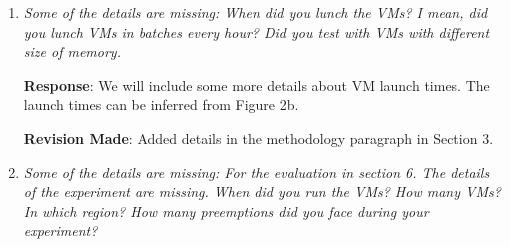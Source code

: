 \documentclass{article}
\newcommand{\resp}[1]{\textbf{Response}: #1}
\newcommand{\revmade}[1]{\textbf{Revision Made}: #1}
\begin{document}
\begin{enumerate}

\item \emph{Some of the details are missing: When did you lunch the VMs? I mean, did you lunch VMs in batches every hour? Did you test with VMs with different size of memory.}

  
\resp{We will include some more details about VM launch times. The launch times can be inferred from Figure 2b.}



\revmade{Added details in the methodology paragraph in Section 3.}



\item \emph{Some of the details are missing: For the evaluation in section 6. The details of the experiment are missing. When did you run the VMs? How many VMs? In which region? How many preemptions did you face during your experiment?}


\end{enumerate}
\end{document}
